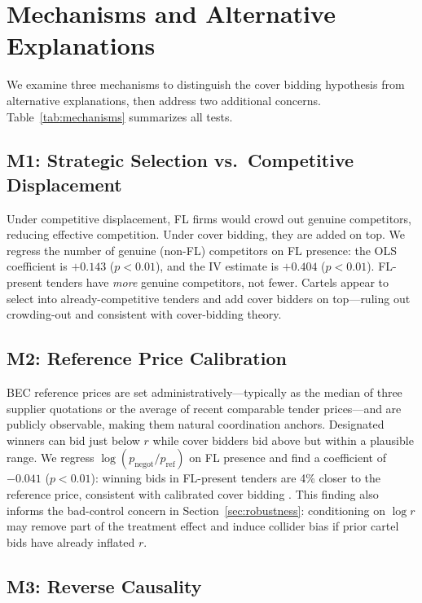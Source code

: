 \section{Mechanisms and Alternative Explanations}
\label{sec:mechanisms}

We examine three mechanisms to distinguish the cover bidding hypothesis
from alternative explanations, then address two additional concerns.
Table~\ref{tab:mechanisms} summarizes all tests.



\subsection{M1: Strategic Selection vs.\ Competitive Displacement}

Under competitive displacement, FL firms would crowd out genuine
competitors, reducing effective competition. Under cover bidding, they
are added on top. We regress the number of genuine (non-FL) competitors
on FL presence: the OLS coefficient is $+0.143$ ($p < 0.01$), and the
IV estimate is $+0.404$ ($p < 0.01$). FL-present tenders have
\emph{more} genuine competitors, not fewer. Cartels appear to select
into already-competitive tenders and add cover bidders on top---ruling
out crowding-out and consistent with cover-bidding theory.

\subsection{M2: Reference Price Calibration}

BEC reference prices are set administratively---typically as the median
of three supplier quotations or the average of recent comparable tender
prices---and are publicly observable, making them natural coordination
anchors. Designated winners can bid just below $r$ while cover bidders
bid above but within a plausible range. We regress
$\log(p_{\text{negot}} / p_{\text{ref}})$ on FL presence and find a
coefficient of $-0.041$ ($p < 0.01$): winning bids in FL-present
tenders are 4\% closer to the reference price, consistent with
calibrated cover bidding \citep{marshall2012economics}. This finding
also informs the bad-control concern in Section~\ref{sec:robustness}:
conditioning on $\log r$ may remove part of the treatment effect and
induce collider bias if prior cartel bids have already inflated $r$.

\subsection{M3: Reverse Causality}

